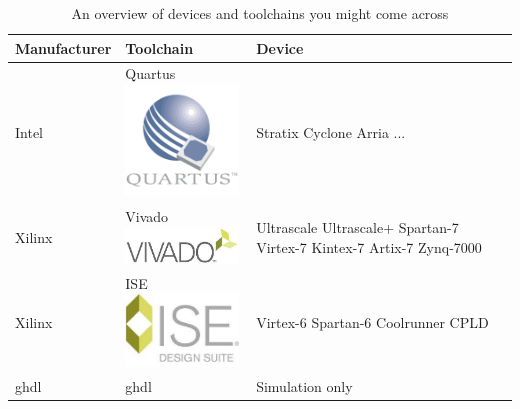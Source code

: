 \begin{table}
    \begin{center}
        \begin{tabular}{| m{4cm} | m{4cm} | m{4cm} |}
            \hline
            Manufacturer & Toolchain & Device \\ \hline
            Intel & Quartus \newline \includegraphics[width=30mm]{./src/quartus_logo.png} & Stratix \newline Cyclone \newline Arria \newline ... \\ \hline
            Xilinx & Vivado \newline  \includegraphics[width=30mm]{./src/vivado_logo.jpg} & Ultrascale \newline Ultrascale+ \newline Spartan-7 \newline Virtex-7 \newline Kintex-7 \newline Artix-7 \newline Zynq-7000 \\ \hline
            Xilinx & ISE \newline \includegraphics[width=30mm]{./src/ise_logo.jpg} & Virtex-6 \newline Spartan-6 \newline Coolrunner CPLD \\ \hline
            ghdl & ghdl & Simulation only \\ \hline
        \end{tabular}
        \caption{An overview of devices and toolchains you might come across}
        \label{table:devices}
    \end{center}
\end{table}

